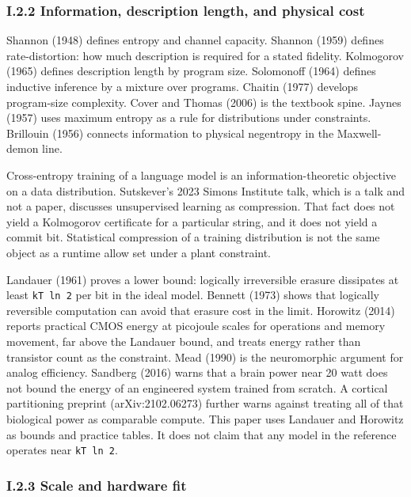 \documentclass[
  10pt,
]{article}
\begin{document}
\subsubsection{I.2.2 Information, description length, and physical
cost}\label{i.2.2-information-description-length-and-physical-cost}

Shannon (1948) defines entropy and channel capacity. Shannon (1959)
defines rate-distortion: how much description is required for a stated
fidelity. Kolmogorov (1965) defines description length by program size.
Solomonoff (1964) defines inductive inference by a mixture over
programs. Chaitin (1977) develops program-size complexity. Cover and
Thomas (2006) is the textbook spine. Jaynes (1957) uses maximum entropy
as a rule for distributions under constraints. Brillouin (1956) connects
information to physical negentropy in the Maxwell-demon line.

Cross-entropy training of a language model is an information-theoretic
objective on a data distribution. Sutskever's 2023 Simons Institute
talk, which is a talk and not a paper, discusses unsupervised learning
as compression. That fact does not yield a Kolmogorov certificate for a
particular string, and it does not yield a commit bit. Statistical
compression of a training distribution is not the same object as a
runtime allow set under a plant constraint.

Landauer (1961) proves a lower bound: logically irreversible erasure
dissipates at least \texttt{kT\ ln\ 2} per bit in the ideal model.
Bennett (1973) shows that logically reversible computation can avoid
that erasure cost in the limit. Horowitz (2014) reports practical CMOS
energy at picojoule scales for operations and memory movement, far above
the Landauer bound, and treats energy rather than transistor count as
the constraint. Mead (1990) is the neuromorphic argument for analog
efficiency. Sandberg (2016) warns that a brain power near 20 watt does
not bound the energy of an engineered system trained from scratch. A
cortical partitioning preprint (arXiv:2102.06273) further warns against
treating all of that biological power as comparable compute. This paper
uses Landauer and Horowitz as bounds and practice tables. It does not
claim that any model in the reference operates near \texttt{kT\ ln\ 2}.

\subsubsection{I.2.3 Scale and hardware
fit}\label{i.2.3-scale-and-hardware-fit}
\end{document}
